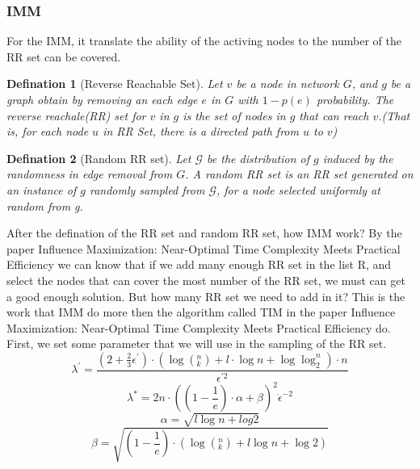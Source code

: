 \documentclass[conference,compsoc]{IEEEtran}
\newtheorem{theorem}{Defination}
\begin{document}
    \subsubsection{IMM}
      For the IMM, it translate the ability of the activing nodes to the number of the RR set can be covered.
      \begin{theorem}[Reverse Reachable Set]
        Let $v$ be a node in network $G$, and $g$ be a graph obtain by removing an each edge $e$ in $G$ with $1-p(e)$ probability. The reverse reachale(RR) set for $v$ in $g$ is the set of nodes in $g$ that can reach $v$.(That is, for each node $u$ in RR Set, there is a directed path from $u$ to $v$)
      \end{theorem}
      \begin{theorem}[Random RR set]
        Let $\mathcal{G}$ be the distribution of $g$ induced by the randomness in edge removal from $G$. A random RR set is an RR set generated on an instance of $g$ randomly sampled from $\mathcal{G}$, for a node selected uniformly at random from g.
      \end{theorem}
      After the defination of the RR set and random RR set, how IMM work? By the paper Influence Maximization: Near-Optimal Time Complexity Meets Practical Efficiency\cite{tang2015influence} we can know that if we add many enough RR set in the list R, and select the nodes that can cover the most number of the RR set, we must can get a good enough solution. But how many RR set we need to add in it? This is the work that IMM do more then the algorithm called TIM in the paper Influence Maximization: Near-Optimal Time Complexity Meets Practical Efficiency \cite{tang2014influence} do.
      First, we set some parameter that we will use in the sampling of the RR set.
      \begin{equation}        
        \lambda^{'} = \frac{(2+\frac{2}{3}\epsilon^{'})\cdot (\log(^{n}_{k})+l\cdot \log n+\log\log_{2}^{n})\cdot n}{\epsilon^{'2}}
      \end{equation}
      \begin{equation}
        \lambda^{*} = 2n\cdot ((1-\frac{1}{e})\cdot\alpha +\beta)^2\dot\epsilon^{-2}
      \end{equation}
      \begin{equation}
        \alpha = \sqrt{l\log n+log 2}
      \end{equation}
      \begin{equation}
        \beta = \sqrt{(1-\frac{1}{e})\cdot(\log(^n_k)+l\log n+ \log 2)}
      \end{equation}
\end{document}
